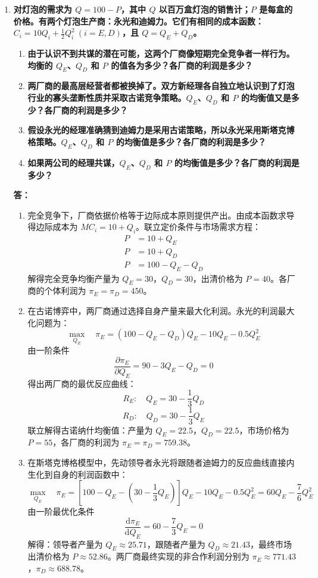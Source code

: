 \begin{enumerate}[label=\textbf{\arabic*.}, leftmargin=*]
		\item \textbf{对灯泡的需求为 $Q = 100 - P$，其中 $Q$ 以百万盒灯泡的销售计；$P$ 是每盒的价格。有两个灯泡生产商：永光和迪姆力。它们有相同的成本函数：$C_i = 10Q_i + \frac{1}{2}Q_i^2 \ (i = E, D)$，且 $Q = Q_E + Q_D$。}
		
		\begin{enumerate}
			\item \textbf{由于认识不到共谋的潜在可能，这两个厂商像短期完全竞争者一样行为。均衡的 $Q_E$、$Q_D$ 和 $P$ 的值各为多少？各厂商的利润是多少？}
			\item \textbf{两厂商的最高层经营者都被换掉了。双方新经理各自独立地认识到了灯泡行业的寡头垄断性质并采取古诺竞争策略。$Q_E$、$Q_D$ 和 $P$ 的均衡值又是多少？各厂商的利润是多少？}
			\item \textbf{假设永光的经理准确猜到迪姆力是采用古诺策略，所以永光采用斯塔克博格策略。$Q_E$、$Q_D$ 和 $P$ 的均衡值是多少？各厂商的利润是多少？}
			\item \textbf{如果两公司的经理共谋，$Q_E$、$Q_D$ 和 $P$ 的均衡值是多少？各厂商的利润是多少？}
		\end{enumerate}
		
		\textbf{答：}
		\begin{enumerate}
			\item[(1)] 完全竞争下，厂商依据价格等于边际成本原则提供产出。由成本函数求导得边际成本为 $MC_i = 10 + Q_i$。联立定价条件与市场需求方程：
			\[
			\begin{aligned}
				P &= 10 + Q_E \\
				P &= 10 + Q_D \\
				P &= 100 - Q_E - Q_D
			\end{aligned}
			\]
			解得完全竞争均衡产量为 $Q_E = 30$，$Q_D = 30$，出清价格为 $P = 40$。各厂商的个体利润为 $\pi_E = \pi_D = 450$。
			
			\item[(2)] 在古诺博弈中，两厂商通过选择自身产量来最大化利润。永光的利润最大化问题为：
			\[ \max_{Q_E} \quad \pi_E = (100 - Q_E - Q_D)Q_E - 10Q_E - 0.5Q_E^2 \]
			由一阶条件 $$\frac{\partial\pi_E}{\partial Q_E} = 90 - 3Q_E - Q_D = 0$$ 得出两厂商的最优反应曲线：
			\[ R_E: \quad Q_E = 30 - \frac{1}{3}Q_D \]
			\[ R_D: \quad Q_D = 30 - \frac{1}{3}Q_E \]
			联立解得古诺纳什均衡值：产量为 $Q_E = 22.5$，$Q_D = 22.5$，市场价格为 $P = 55$，各厂商的利润为 $\pi_E = \pi_D = 759.38$。
			
			\item[(3)] 在斯塔克博格模型中，先动领导者永光将跟随者迪姆力的反应曲线直接内生化到自身的利润函数中：
			\[ \max_{Q_E} \quad \pi_E = \left[100 - Q_E - \left(30 - \frac{1}{3}Q_E\right)\right]Q_E - 10Q_E - 0.5Q_E^2 = 60Q_E - \frac{7}{6}Q_E^2 \]
			由一阶最优化条件
			$$\frac{\mathrm{d}\pi_E}{\mathrm{d}Q_E} = 60 - \frac{7}{3}Q_E = 0$$ 
			解得：领导者产量为 $Q_E \approx 25.71$，跟随者产量为 $Q_D \approx 21.43$，最终市场出清价格为 $P \approx 52.86$。两厂商最终实现的非合作利润分别为 $\pi_E \approx 771.43$，$\pi_D \approx 688.78$。
			

\end{enumerate}
\end{enumerate}
